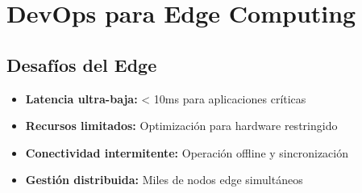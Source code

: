 \documentclass[12pt,a4paper]{article}
\begin{document}
\section{DevOps para Edge Computing}

\subsection{Desafíos del Edge}
\begin{itemize}
    \item \textbf{Latencia ultra-baja:} < 10ms para aplicaciones críticas
    \item \textbf{Recursos limitados:} Optimización para hardware restringido
    \item \textbf{Conectividad intermitente:} Operación offline y sincronización
    \item \textbf{Gestión distribuida:} Miles de nodos edge simultáneos
\end{itemize}
\end{document}
